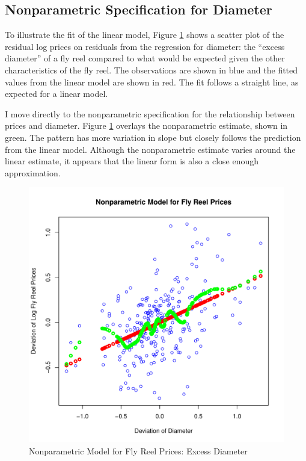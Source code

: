 \clearpage
\subsection{Nonparametric Specification for Diameter}

To illustrate the fit of the linear model, 
Figure \ref{fig:dev_np_vs_diameter_dev} 
shows a scatter plot 
of the residual log prices on 
residuals from the regression for 
diameter:
the ``excess diameter'' of a fly reel 
compared to what would be 
expected given the other characteristics of the fly reel. 
The observations are shown in blue
and the fitted values from the linear model are shown in red.
The fit follows a straight line, as expected for a linear model. 

% 
I move directly to the nonparametric specification for 
the relationship between prices and 
diameter.
Figure \ref{fig:dev_np_vs_diameter_dev} 
overlays the nonparametric estimate, shown in green. 
The pattern has more variation in slope but 
closely follows the prediction from the linear model. 
Although the nonparametric estimate varies around the linear estimate,
it appears that the linear form
is also a close enough approximation.


\begin{figure}[h!]
  \centering
  \includegraphics[scale = 0.5, keepaspectratio=true]{../Figures/dev_np_vs_diameter_dev}
  \caption{Nonparametric Model for Fly Reel Prices: Excess Diameter} \label{fig:dev_np_vs_diameter_dev}
\end{figure}



